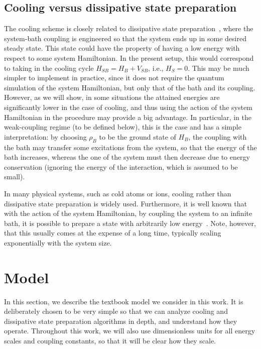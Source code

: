 \documentclass[aps,prx,twocolumn,superscriptaddress,nofootinbib,nolongbibliography,nobalancelastpage,10pt,floatfix]{revtex4-2}
\begin{document}
\subsection{Cooling versus dissipative state preparation}
\label{subsec:cooling_vs_dsp}

The cooling scheme is closely related to dissipative state preparation~\cite{Poyatos1996Quantum,Kraus2008Preparation,Diehl2008Quantum,Verstraete2009Quantuma},
where the system-bath coupling is engineered so that the system ends up in some desired steady state.
This state could have the property of having a low energy with respect to some system Hamiltonian. In the present setup, this would correspond to taking in the cooling cycle $H_{SB} = H_B + V_{SB}$, i.e., $H_S=0$. This may be much simpler to implement in practice, since it does not require the quantum simulation of the system Hamiltonian, but only that of the bath and its coupling. However, as we will show, in some situations the attained energies are significantly lower in the case of cooling, and thus using the action of the system Hamiltonian in the procedure may provide a big advantage. In particular, in the weak-coupling regime (to be defined below), this is the case and has a simple interpretation: by choosing $\rho_B$ to be the ground state of $H_B$, the coupling with the bath may transfer some excitations from the system, so that the energy of the bath increases, whereas the one of the system must then decrease due to energy conservation (ignoring the energy of the interaction, which is assumed to be small).


In many physical systems, such as cold atoms or ions, cooling rather than dissipative state preparation is widely used. Furthermore, it is well known that with the action of the system Hamiltonian, by coupling the system to an infinite bath, it is possible to prepare a state with arbitrarily low energy~\cite{Davies1974Markovian}. Note, however, that this usually comes at the expense of a long time, typically scaling exponentially with the system size.

\section{Model}
\label{sec:model}
In this section, we describe the textbook model we consider in this work. It is deliberately chosen to be very simple so that we can analyze cooling and dissipative state preparation algorithms in depth, and understand how they operate.
Throughout this work, we will also use dimensionless units for all energy scales and coupling constants, so that it will be clear how they scale.
\end{document}
